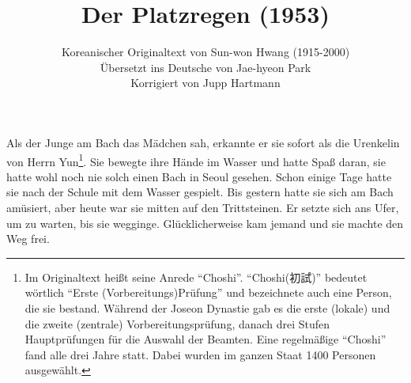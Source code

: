 \documentclass[prd,12pt,tightenlines,notitlepage,nofootinbib]{revtex4-1}
\begin{document}
\title{Der Platzregen (1953)}
\author{Koreanischer Originaltext von Sun-won Hwang (1915-2000)
\\ Übersetzt ins Deutsche von Jae-hyeon Park
\\ Korrigiert von Jupp Hartmann}
\maketitle

\noindent
Als der Junge am Bach das Mädchen sah, erkannte er sie sofort als die
Urenkelin von Herrn Yun\footnote{Im Originaltext heißt seine Anrede "`Choshi"'.
"`Choshi({初試})"' bedeutet wörtlich "`Erste (Vorbereitungs)Prüfung"' und
bezeichnete auch eine Person, die sie bestand.
Während der Joseon Dynastie gab es
die erste (lokale) und die zweite (zentrale) Vorbereitungsprüfung,
danach drei Stufen Hauptprüfungen für die Auswahl der Beamten.
Eine regelmäßige "`Choshi"' fand alle drei Jahre statt. Dabei wurden
im ganzen Staat 1400 Personen ausgewählt.}.
Sie bewegte ihre Hände im Wasser und hatte
Spaß daran, sie hatte wohl noch nie solch einen Bach in Seoul gesehen.
Schon einige Tage hatte sie nach der Schule mit dem Wasser gespielt.
Bis gestern hatte sie sich am Bach amüsiert,
aber heute war sie mitten auf den Trittsteinen.  Er
setzte sich ans Ufer, um zu warten, bis sie wegginge.  Glücklicherweise kam
jemand und sie machte den Weg frei.
\end{document}
